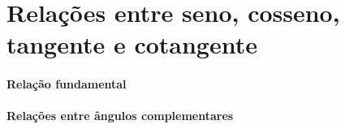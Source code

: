 \section{Relações entre seno, cosseno, tangente e cotangente}

  \paragraph{Relação fundamental}

  \paragraph{Relações entre ângulos complementares}




